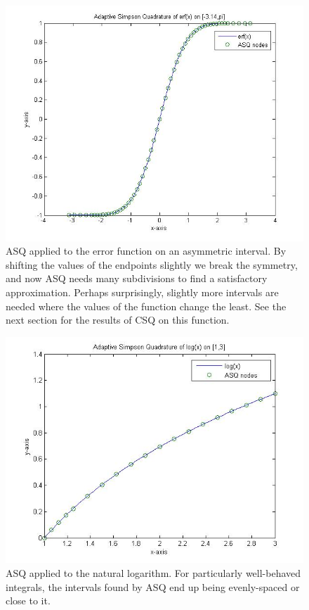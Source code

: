 \begin{center}
\begin{figure}[H]
\centering
  \includegraphics[width=550px]{graphics/erf_adaptive_simps2.jpg}
  \caption[ASQ applied to the error function on an asymmetric interval]{ASQ applied to the error function on an asymmetric interval. By shifting the values of the endpoints slightly we break the symmetry, and now ASQ needs many subdivisions to find a satisfactory approximation. Perhaps surprisingly, slightly more intervals are needed where the values of the function change the least. See the next section for the results of CSQ on this function.}
\end{figure}

\begin{figure}[H]
\centering
  \includegraphics[width=450px]{graphics/log_adaptive_simps.jpg}
  \caption[ASQ applied to the natural logarithm]{ASQ applied to the natural logarithm. For particularly well-behaved integrals, the intervals found by ASQ end up being evenly-spaced or close to it.}
\end{figure}


\end{center}
